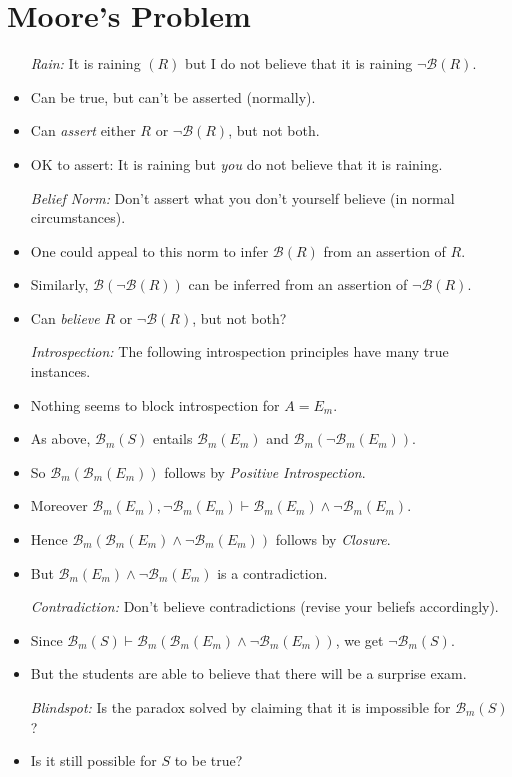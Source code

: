 \documentclass[a4paper, 11pt]{article} %
\newcommand{\B}{\mathcal{B}}
\newcommand{\B}{\mathfrak{B}}
\begin{document}
\section*{Moore's Problem}

\begin{itemize}
  \item[\it Rain:] It is raining $(R)$ but I do not believe that it is raining $\neg \B (R)$.
    \item Can be true, but can't be asserted (normally).
    \item Can \textit{assert} either $R$ or $\neg \B(R)$, but not both. 
    \item OK to assert: It is raining but \textit{you} do not believe that it is raining.
  \item[\it Belief Norm:] Don't assert what you don't yourself believe (in normal circumstances).
    \item One could appeal to this norm to infer $\B(R)$ from an assertion of $R$.
    \item Similarly, $\B(\neg \B(R))$ can be inferred from an assertion of $\neg \B(R)$.
    \item Can \textit{believe} $R$ or $\neg \B(R)$, but not both?
  \item[\it Introspection:] The following introspection principles have many true instances.
    \vspace{-.05in}
    \vspace{-.1in}
    \item Nothing seems to block introspection for $A = E_m$.
    \item As above, $\B_m(S)$ entails $\B_m(E_m)$ and $\B_m(\neg \B_m(E_m))$. 
    \item So $\B_m(\B_m(E_m))$ follows by \textit{Positive Introspection}. 
    \item Moreover $\B_m(E_m), \neg \B_m(E_m) \vdash \B_m(E_m) \wedge \neg \B_m(E_m)$.
    \item Hence $\B_m(\B_m(E_m) \wedge \neg \B_m(E_m))$ follows by \textit{Closure}. 
    \item But $\B_m(E_m) \wedge \neg \B_m(E_m)$ is a contradiction. 
  \item[\it Contradiction:] Don't believe contradictions (revise your beliefs accordingly).
    \item Since $\B_m(S) \vdash \B_m(\B_m(E_m) \wedge \neg \B_m(E_m))$, we get $\neg \B_m(S)$.
    \item But the students are able to believe that there will be a surprise exam.
  \item[\it Blindspot:] Is the paradox solved by claiming that it is impossible for $\B_m(S)$?
    \item Is it still possible for $S$ to be true? 
\end{itemize}
\end{document}
